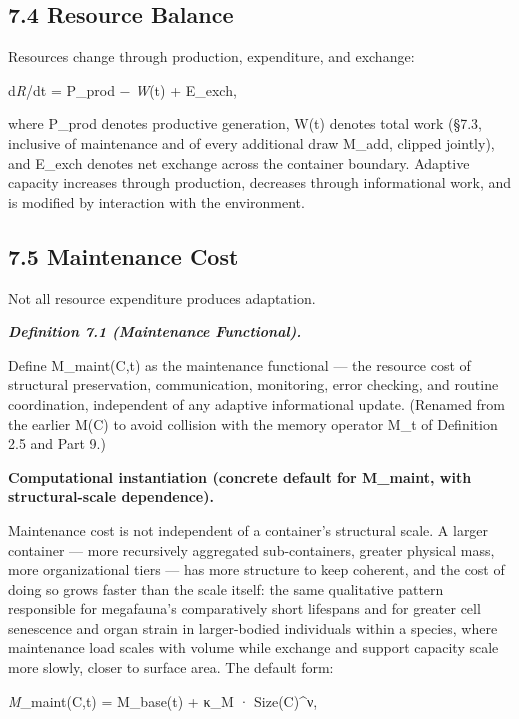 \documentclass[
]{article}
\begin{document}
\hypertarget{resource-balance}{%
\subsection{7.4 Resource Balance}\label{resource-balance}}

Resources change through production, expenditure, and exchange:

d\emph{R}/dt = P\_prod − \emph{W}(t) + E\_exch,

where P\_prod denotes productive generation, W(t) denotes total work
(§7.3, inclusive of maintenance and of every additional draw M\_add,
clipped jointly), and E\_exch denotes net exchange across the container
boundary. Adaptive capacity increases through production, decreases
through informational work, and is modified by interaction with the
environment.

\hypertarget{maintenance-cost}{%
\subsection{7.5 Maintenance Cost}\label{maintenance-cost}}

Not all resource expenditure produces adaptation.

\emph{\textbf{Definition 7.1 (Maintenance Functional).}}

Define M\_maint(C,t) as the maintenance functional --- the resource cost
of structural preservation, communication, monitoring, error checking,
and routine coordination, independent of any adaptive informational
update. (Renamed from the earlier M(C) to avoid collision with the
memory operator M\_t of Definition 2.5 and Part 9.)

\textbf{Computational instantiation (concrete default for M\_maint, with
structural-scale dependence).}

Maintenance cost is not independent of a container's structural scale. A
larger container --- more recursively aggregated sub-containers, greater
physical mass, more organizational tiers --- has more structure to keep
coherent, and the cost of doing so grows faster than the scale itself:
the same qualitative pattern responsible for megafauna's comparatively
short lifespans and for greater cell senescence and organ strain in
larger-bodied individuals within a species, where maintenance load
scales with volume while exchange and support capacity scale more
slowly, closer to surface area. The default form:

\emph{M}\_maint(C,t) = M\_base(t) + κ\_M · Size(C)\^{}ν,
\end{document}
